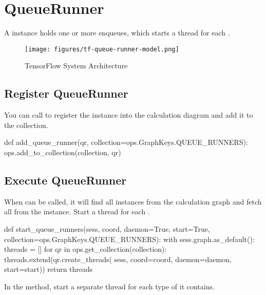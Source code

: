 \section{QueueRunner}
\begin{content}
A  instance holds one or more  enqueues, which starts a thread for each .

\begin{figure}[!htbp]
  \centering
  \texttt{[image: figures/tf-queue-runner-model.png]}
  \caption{TensorFlow System Architecture}
  \label{fig:tf-queue-runner-model}
\end{figure}


\subsection{Register QueueRunner}
You can call  to register the  instance into the calculation diagram and add it to the  collection.

\begin{leftbar}
\begin{python}
def add_queue_runner(qr, collection=ops.GraphKeys.QUEUE_RUNNERS):
  ops.add_to_collection(collection, qr)
\end{python}
\end{leftbar}


\subsection{Execute QueueRunner}
When  can be called, it will find all  instances from the calculation graph and fetch all  from the  instance. Start a thread for each .

\begin{leftbar}
\begin{python}
def start_queue_runners(sess, coord, daemon=True, start=True,
                        collection=ops.GraphKeys.QUEUE_RUNNERS):
  with sess.graph.as_default():
    threads = []
    for qr in ops.get_collection(collection):
      threads.extend(qr.create_threads(
          sess, coord=coord, daemon=daemon, start=start))
  return threads
\end{python}
\end{leftbar}

In the  method, start a separate thread for each  type of  it contains.


\end{content}
